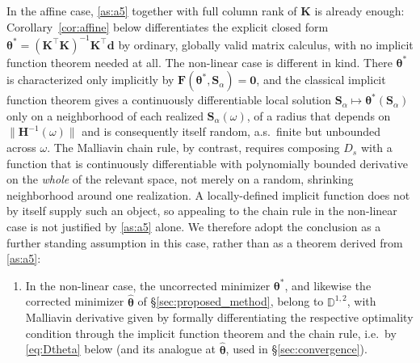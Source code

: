 \documentclass[11pt, a4paper]{article}
\theoremstyle{theoremstyle}
\theoremstyle{definitionstyle}
\begin{document}
In the affine case, \ref{as:a5} together with full column rank of $\mathbf K$ is already enough: Corollary~\ref{cor:affine} below differentiates the explicit closed form $\boldsymbol\theta^*=(\mathbf K^\top\mathbf K)^{-1}\mathbf K^\top\mathbf d$ by ordinary, globally valid matrix calculus, with no implicit function theorem needed at all. The non-linear case is different in kind. There $\boldsymbol\theta^*$ is characterized only implicitly by $\mathbf F(\boldsymbol\theta^*,\mathbf S_\alpha) = \mathbf 0$, and the classical implicit function theorem gives a continuously differentiable local solution $\mathbf S_\alpha \mapsto \boldsymbol\theta^*(\mathbf S_\alpha)$ only on a neighborhood of each realized $\mathbf S_\alpha(\omega)$, of a radius that depends on $\|\mathbf H^{-1}(\omega)\|$ and is consequently itself random, a.s.\ finite but unbounded across $\omega$. The Malliavin chain rule, by contrast, requires composing $D_s$ with a function that is continuously differentiable with polynomially bounded derivative on the \emph{whole} of the relevant space, not merely on a random, shrinking neighborhood around one realization. A locally-defined implicit function does not by itself supply such an object, so appealing to the chain rule in the non-linear case is not justified by \ref{as:a5} alone. We therefore adopt the conclusion as a further standing assumption in this case, rather than as a theorem derived from \ref{as:a5}:

\begin{enumerate}[label=(A5b)]
    \item \label{as:a5b} In the non-linear case, the uncorrected minimizer $\boldsymbol\theta^*$, and likewise the corrected minimizer $\hat{\boldsymbol\theta}$ of \S\ref{sec:proposed_method}, belong to $\mathbb D^{1,2}$, with Malliavin derivative given by formally differentiating the respective optimality condition through the implicit function theorem and the chain rule, i.e.\ by \eqref{eq:Dtheta} below (and its analogue at $\hat{\boldsymbol\theta}$, used in \S\ref{sec:convergence}).
\end{enumerate}
\end{document}

